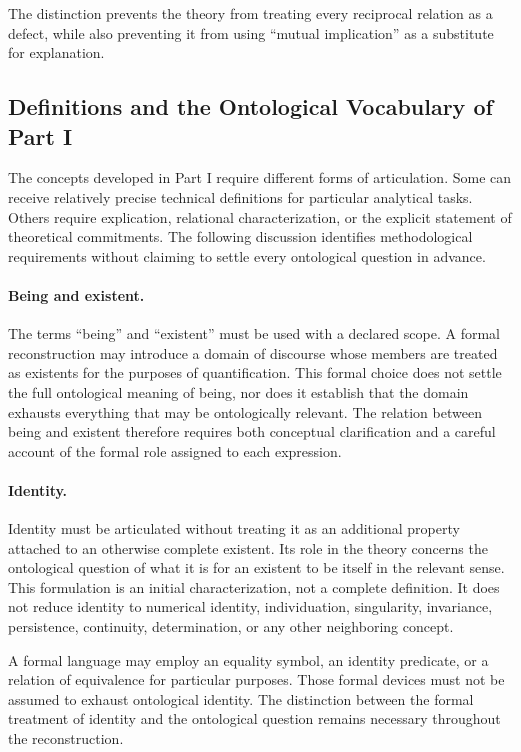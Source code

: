 The distinction prevents the theory from treating every reciprocal
relation as a defect, while also preventing it from using
``mutual implication'' as a substitute for explanation.

\subsection{Definitions and the Ontological Vocabulary of Part I}

The concepts developed in Part I require different forms of
articulation. Some can receive relatively precise technical
definitions for particular analytical tasks. Others require
explication, relational characterization, or the explicit statement
of theoretical commitments. The following discussion identifies
methodological requirements without claiming to settle every
ontological question in advance.

\paragraph{Being and existent.}

The terms ``being'' and ``existent'' must be used with a declared
scope. A formal reconstruction may introduce a domain of discourse
whose members are treated as existents for the purposes of
quantification. This formal choice does not settle the full
ontological meaning of being, nor does it establish that the domain
exhausts everything that may be ontologically relevant. The relation
between being and existent therefore requires both conceptual
clarification and a careful account of the formal role assigned to
each expression.

\paragraph{Identity.}

Identity must be articulated without treating it as an additional
property attached to an otherwise complete existent. Its role in
the theory concerns the ontological question of what it is for an
existent to be itself in the relevant sense. This formulation is
an initial characterization, not a complete definition. It does
not reduce identity to numerical identity, individuation,
singularity, invariance, persistence, continuity, determination,
or any other neighboring concept.

A formal language may employ an equality symbol, an identity
predicate, or a relation of equivalence for particular purposes.
Those formal devices must not be assumed to exhaust ontological
identity. The distinction between the formal treatment of identity
and the ontological question remains necessary throughout the
reconstruction.

